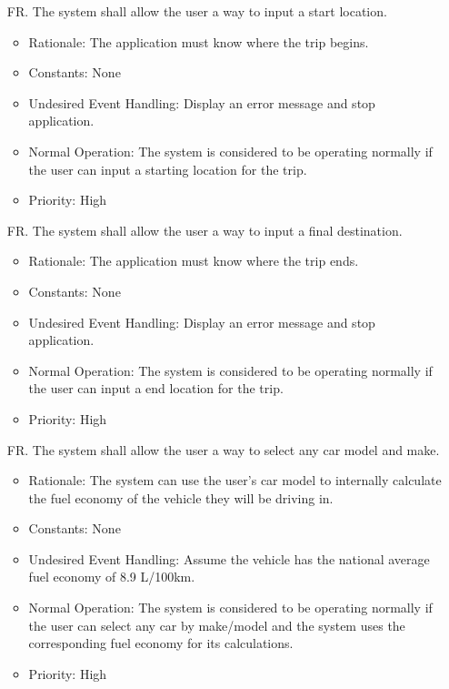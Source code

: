 \documentclass[12pt]{article}
\newcounter{reqnum} %
\begin{document}
\noindent \begin{itemize}

\item[FR\refstepcounter{reqnum}\thereqnum. ] The system shall allow the user a way to input a start location.
\begin{itemize}
    \item Rationale: The application must know where the trip begins.
    \item Constants: None
    \item Undesired Event Handling: Display an error message and stop application.
    \item Normal Operation: The system is considered to be operating normally if the user can input a starting location for the trip.
	\item Priority: High
\end{itemize}

\item[FR\refstepcounter{reqnum}\thereqnum. ] The system shall allow the user a way to input a final destination.
\begin{itemize}
    \item Rationale: The application must know where the trip ends.
    \item Constants: None
    \item Undesired Event Handling: Display an error message and stop application.
    \item Normal Operation: The system is considered to be operating normally if the user can input a end location for the trip.
	\item Priority: High
\end{itemize}

\item[FR\refstepcounter{reqnum}\thereqnum. ] The system shall allow the user a way to select any car model and make.
\begin{itemize}
    \item Rationale: The system can use the user's car model to internally calculate the fuel economy of the vehicle they will be driving in.
    \item Constants: None
    \item Undesired Event Handling: Assume the vehicle has the national average fuel economy of 8.9 L/100km.
    \item Normal Operation: The system is considered to be operating normally if the user can select any car by make/model and the system uses the corresponding fuel economy for its calculations.
	\item Priority: High
\end{itemize}


\end{itemize}
\end{document}
